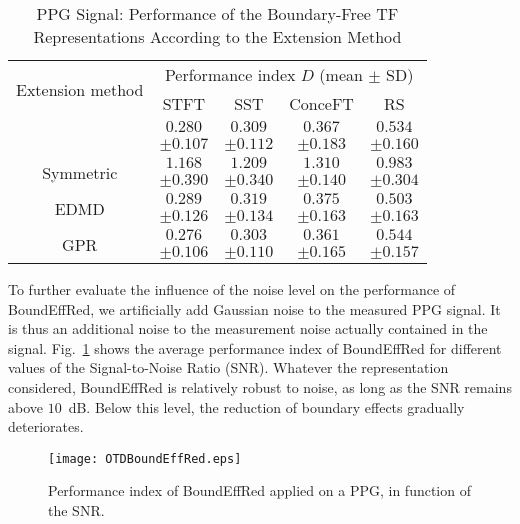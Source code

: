 \begin{table}
\centering
\caption{PPG Signal: Performance of the Boundary-Free TF Representations According to the Extension Method}
\begin{tabular}{|c||c|c|c|c|}
  \hline
   \multirow{2}{40pt}{\centering Extension method} & \multicolumn{4}{c|}{Performance index $D$ (mean $\pm$ SD)} \\
   \cline{2-5}
      & STFT & SST & ConceFT & RS\\
   \hhline{|=#=|=|=|=|}
   \multirow{2}{40pt}{\centering {\sf SigExt}} & $0.280$ & $0.309$ & $0.367$ & $0.534$ \\
    & $\pm 0.107$ & $\pm 0.112$ & $\pm 0.183$ & $\pm 0.160$ \\
   \hline
   \multirow{2}{40pt}{\centering Symmetric} & $1.168$ & $1.209$ & $1.310$ & $0.983$ \\
   & $\pm 0.390$ & $\pm 0.340$ & $\pm 0.140$ & $\pm 0.304$ \\
   \hline
   \multirow{2}{40pt}{\centering EDMD} & $0.289$ & $0.319$ & $0.375$ & $0.503$ \\
   & $\pm 0.126$ & $\pm 0.134$ & $\pm 0.163$ & $\pm 0.163$ \\
   \hline
   \multirow{2}{40pt}{\centering GPR} & $0.276$ & $0.303$ & $0.361$ & $0.544$ \\
   & $\pm 0.106$ & $\pm 0.110$ & $\pm 0.165$ & $\pm 0.157$ \\
   \hline
\end{tabular}
\label{tab:otd.ppg}
\end{table}

To further evaluate the influence of the noise level on the performance of {\sf BoundEffRed}, we artificially add Gaussian noise to the measured PPG signal. It is thus an additional noise to the measurement noise actually contained in the signal. Fig.~\ref{fig:otd.noise} shows the average performance index of {\sf BoundEffRed} for different values of the Signal-to-Noise Ratio (SNR). Whatever the representation considered, {\sf BoundEffRed} is relatively robust to noise, as long as the SNR remains above $10$~dB. Below this level, the reduction of boundary effects gradually deteriorates.

\begin{figure}
\centering
\texttt{[image: OTDBoundEffRed.eps]}
\caption{Performance index of {\sf BoundEffRed} applied on a PPG, in function of the SNR.}
\label{fig:otd.noise}
\end{figure}


